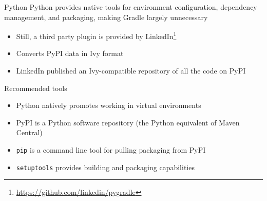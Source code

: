 \documentclass[presentation]{beamer}
\newcommand{\fnurl}[1]{\footnote{\url{#1}}}
\begin{document}
\begin{frame}[fragile]{Python}
    Python provides native tools for environment configuration, dependency management, and packaging, making Gradle largely unnecessary
    \begin{itemize}
        \item Still, a third party plugin is provided by LinkedIn\fnurl{https://github.com/linkedin/pygradle}
        \item Converts PyPI data in Ivy format
        \item LinkedIn published an Ivy-compatible repository of all the code on PyPI
    \end{itemize}
    \begin{block}{Recommended tools}
        \begin{itemize}
            \item Python natively promotes working in virtual environments
            \item PyPI is a Python software repository (the Python equivalent of Maven Central)
            \item \texttt{pip} is a command line tool for pulling packaging from PyPI
            \item \texttt{setuptools} provides building and packaging capabilities
        \end{itemize}
    \end{block}
\end{frame}    
\end{document}
